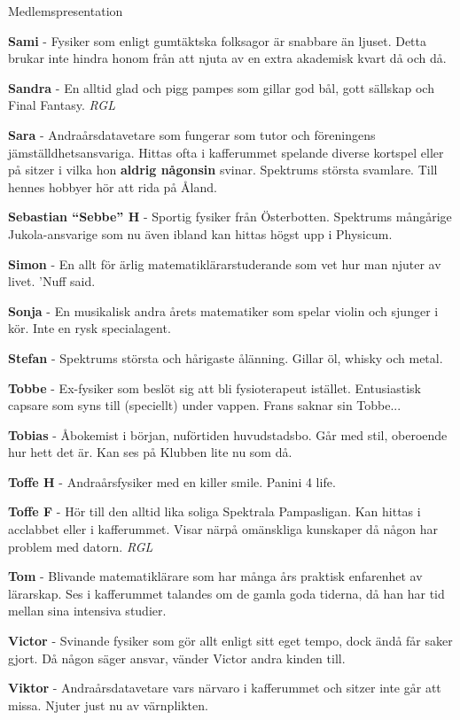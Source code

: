 \documentclass{spektraklet}
\begin{document}
\begin{artikel}{Medlemspresentation}{}
\begin{twocolumns}
\textbf{Sami} - Fysiker som enligt gumtäktska folksagor är snabbare än ljuset. Detta brukar inte hindra honom från att njuta av en extra akademisk kvart då och då.

\textbf{Sandra} - En alltid glad och pigg pampes som gillar god bål, gott sällskap och Final Fantasy. \emph{RGL}

\textbf{Sara} - Andraårsdatavetare som fungerar som tutor och föreningens jämställdhetsansvariga. Hittas ofta i kafferummet spelande diverse kortspel eller på sitzer i vilka hon \textbf{aldrig någonsin} svinar. Spektrums största svamlare. Till hennes hobbyer hör att rida på Åland.

\textbf{Sebastian ``Sebbe'' H} - Sportig fysiker från Österbotten. Spektrums mångårige Jukola-ansvarige som nu även ibland kan hittas högst upp i Physicum.

\textbf{Simon} - En allt för ärlig matematiklärarstuderande som vet hur man njuter av livet. ’Nuff said.

\textbf{Sonja} - En musikalisk andra årets matematiker som spelar violin och sjunger i kör. Inte en rysk specialagent.

\textbf{Stefan} - Spektrums största och hårigaste ålänning. Gillar öl, whisky och metal.

\textbf{Tobbe} - Ex-fysiker som beslöt sig att bli fysioterapeut istället. Entusiastisk capsare som syns till (speciellt) under vappen. Frans saknar sin Tobbe... %

\textbf{Tobias} - Åbokemist i början, nuförtiden huvudstadsbo. Går med stil, oberoende hur hett det är. Kan ses på Klubben lite nu som då.

\textbf{Toffe H} - Andraårsfysiker med en killer smile. Panini 4 life.

\textbf{Toffe F} - Hör till den alltid lika soliga Spektrala Pampasligan. Kan hittas i acclabbet eller i kafferummet. Visar närpå omänskliga kunskaper då någon har problem med datorn. \emph{RGL}

\textbf{Tom} - Blivande matematiklärare som har många års praktisk enfarenhet av lärarskap. Ses i kafferummet talandes om de gamla goda tiderna, då han har tid mellan sina intensiva studier.

\textbf{Victor} - Svinande fysiker som gör allt enligt sitt eget tempo, dock ändå får saker gjort. Då någon säger ansvar, vänder Victor andra kinden till.

\textbf{Viktor} - Andraårsdatavetare vars närvaro i kafferummet och sitzer inte går att missa. Njuter just nu av värnplikten.


\end{twocolumns}
\end{artikel}
\end{document}
